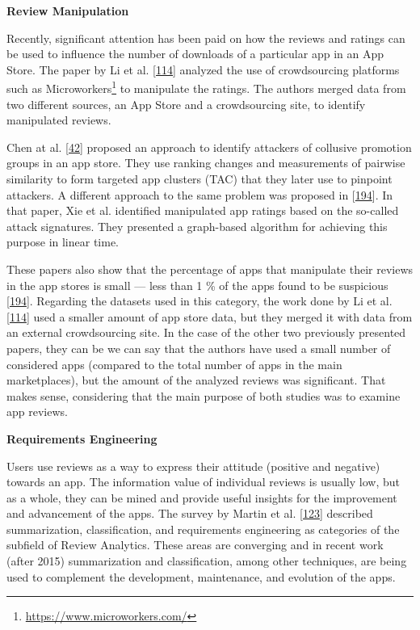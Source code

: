 \documentclass[]{book}
\let\rmarkdownfootnote\footnote%
\def\footnote{\protect\rmarkdownfootnote}
\begin{document}
\textbf{Review Manipulation}

Recently, significant attention has been paid on how the reviews and
ratings can be used to influence the number of downloads of a particular
app in an App Store. The paper by Li et al.
{[}\protect\hyperlink{ref-i2017crowdsourced}{114}{]} analyzed the use of
crowdsourcing platforms such as Microworkers\footnote{\url{https://www.microworkers.com/}}
to manipulate the ratings. The authors merged data from two different
sources, an App Store and a crowdsourcing site, to identify manipulated
reviews.

Chen at al. {[}\protect\hyperlink{ref-chen2017toward}{42}{]} proposed an
approach to identify attackers of collusive promotion groups in an app
store. They use ranking changes and measurements of pairwise similarity
to form targeted app clusters (TAC) that they later use to pinpoint
attackers. A different approach to the same problem was proposed in
{[}\protect\hyperlink{ref-xie2016you}{194}{]}. In that paper, Xie et al.
identified manipulated app ratings based on the so-called attack
signatures. They presented a graph-based algorithm for achieving this
purpose in linear time.

These papers also show that the percentage of apps that manipulate their
reviews in the app stores is small --- less than 1 \% of the apps found
to be suspicious {[}\protect\hyperlink{ref-xie2016you}{194}{]}.
Regarding the datasets used in this category, the work done by Li et al.
{[}\protect\hyperlink{ref-i2017crowdsourced}{114}{]} used a smaller
amount of app store data, but they merged it with data from an external
crowdsourcing site. In the case of the other two previously presented
papers, they can be we can say that the authors have used a small number
of considered apps (compared to the total number of apps in the main
marketplaces), but the amount of the analyzed reviews was significant.
That makes sense, considering that the main purpose of both studies was
to examine app reviews.

\textbf{Requirements Engineering}

Users use reviews as a way to express their attitude (positive and
negative) towards an app. The information value of individual reviews is
usually low, but as a whole, they can be mined and provide useful
insights for the improvement and advancement of the apps. The survey by
Martin et al. {[}\protect\hyperlink{ref-martin2015survey}{123}{]}
described summarization, classification, and requirements engineering as
categories of the subfield of Review Analytics. These areas are
converging and in recent work (after 2015) summarization and
classification, among other techniques, are being used to complement the
development, maintenance, and evolution of the apps.
\end{document}
